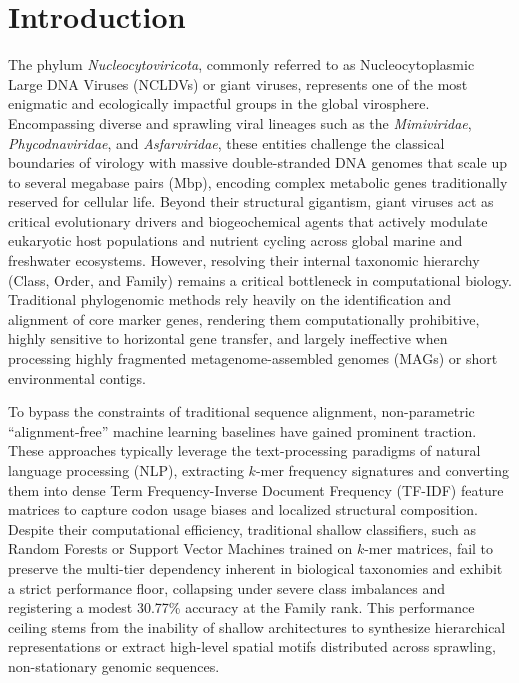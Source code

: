 \documentclass[11pt,a4paper]{article}
\begin{document}
\section{Introduction}
The phylum \textit{Nucleocytoviricota}, commonly referred to as Nucleocytoplasmic Large DNA Viruses (NCLDVs) or giant viruses, represents one of the most enigmatic and ecologically impactful groups in the global virosphere. Encompassing diverse and sprawling viral lineages such as the \textit{Mimiviridae}, \textit{Phycodnaviridae}, and \textit{Asfarviridae}, these entities challenge the classical boundaries of virology with massive double-stranded DNA genomes that scale up to several megabase pairs (Mbp), encoding complex metabolic genes traditionally reserved for cellular life. Beyond their structural gigantism, giant viruses act as critical evolutionary drivers and biogeochemical agents that actively modulate eukaryotic host populations and nutrient cycling across global marine and freshwater ecosystems. However, resolving their internal taxonomic hierarchy (Class, Order, and Family) remains a critical bottleneck in computational biology. Traditional phylogenomic methods rely heavily on the identification and alignment of core marker genes, rendering them computationally prohibitive, highly sensitive to horizontal gene transfer, and largely ineffective when processing highly fragmented metagenome-assembled genomes (MAGs) or short environmental contigs.

To bypass the constraints of traditional sequence alignment, non-parametric ``alignment-free'' machine learning baselines have gained prominent traction. These approaches typically leverage the text-processing paradigms of natural language processing (NLP), extracting $k$-mer frequency signatures and converting them into dense Term Frequency-Inverse Document Frequency (TF-IDF) feature matrices to capture codon usage biases and localized structural composition. Despite their computational efficiency, traditional shallow classifiers, such as Random Forests or Support Vector Machines trained on $k$-mer matrices, fail to preserve the multi-tier dependency inherent in biological taxonomies and exhibit a strict performance floor, collapsing under severe class imbalances and registering a modest 30.77\% accuracy at the Family rank. This performance ceiling stems from the inability of shallow architectures to synthesize hierarchical representations or extract high-level spatial motifs distributed across sprawling, non-stationary genomic sequences.
\end{document}

